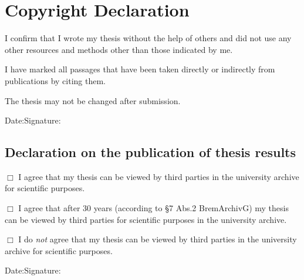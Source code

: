 \chapter*{Copyright Declaration}
I confirm that I wrote my thesis without the help of others and did not use any other resources and methods other than those indicated by me.\par
I have marked all passages that have been taken directly or indirectly from publications by citing them.\par
The thesis may not be changed after submission.\par
\vspace{2.5em}
Date:\underline{\hspace{3.5cm}}\qquad Signature:\underline{\hspace{5.5cm}}
\vspace{3em}
\section*{Declaration on the publication of thesis results}
$\Box$ I agree that my thesis can be viewed by third parties in the university archive for scientific purposes. \par
$\Box$ I agree that after 30 years (according to §7 Abs.2 BremArchivG) my thesis can be viewed by third parties for scientific purposes in the university archive. \par
$\Box$ I do \textit{not} agree that my thesis can be viewed by third parties in the university archive for scientific purposes. \par
\vspace{2.5em}
Date:\underline{\hspace{3.5cm}}\qquad Signature:\underline{\hspace{5.5cm}}